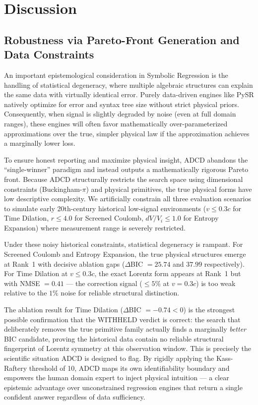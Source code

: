 ﻿\documentclass{article}
\begin{document}
\section{Discussion}

\subsection{Robustness via Pareto-Front Generation and Data Constraints}

An important epistemological consideration in Symbolic Regression is the handling of statistical degeneracy, where multiple algebraic structures can explain the same data with virtually identical error. Purely data-driven engines like PySR natively optimize for error and syntax tree size without strict physical priors. Consequently, when signal is slightly degraded by noise (even at full domain ranges), these engines will often favor mathematically over-parameterized approximations over the true, simpler physical law if the approximation achieves a marginally lower loss.

To ensure honest reporting and maximize physical insight, ADCD abandons the ``single-winner'' paradigm and instead outputs a mathematically rigorous Pareto front. Because ADCD structurally restricts the search space using dimensional constraints (Buckingham-$\pi$) and physical primitives, the true physical forms have low descriptive complexity. We artificially constrain all three evaluation scenarios to simulate early 20th-century historical low-signal environments ($v \le 0.3c$ for Time Dilation, $r \le 4.0$ for Screened Coulomb, $dV/V_i \le 1.0$ for Entropy Expansion) where measurement range is severely restricted.

  Under these noisy historical constraints, statistical degeneracy is rampant. For Screened Coulomb and Entropy Expansion, the true physical structures emerge at Rank~1 with decisive ablation gaps ($\Delta$BIC $= 25.74$ and $37.99$ respectively). For Time Dilation at $v \le 0.3c$, the exact Lorentz form appears at Rank~1 but with NMSE $= 0.41$ --- the correction signal ($\le 5\%$ at $v = 0.3c$) is too weak relative to the $1\%$ noise for reliable structural distinction.

  The ablation result for Time Dilation ($\Delta$BIC $= -0.74 < 0$) is the strongest possible confirmation that the WITHHELD verdict is correct: the search that deliberately removes the true primitive family actually finds a marginally \emph{better} BIC candidate, proving the historical data contain no reliable structural fingerprint of Lorentz symmetry at this observation window. This is precisely the scientific situation ADCD is designed to flag. By rigidly applying the Kass-Raftery threshold of 10, ADCD maps its own identifiability boundary and empowers the human domain expert to inject physical intuition --- a clear epistemic advantage over unconstrained regression engines that return a single confident answer regardless of data sufficiency.
\end{document}
